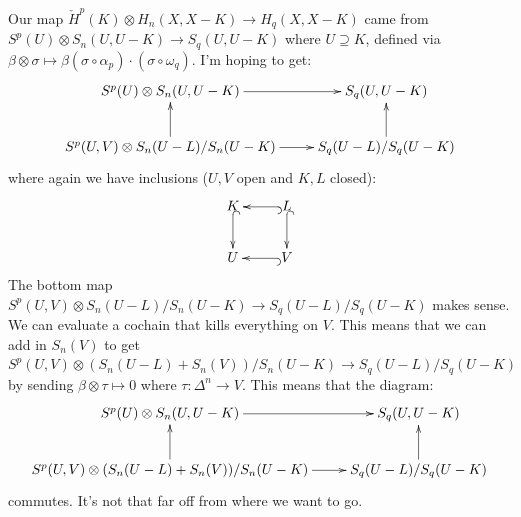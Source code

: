\documentclass{amsart}
\theoremstyle{theorem}
\theoremstyle{definition}
\newcommand\cHH{\check{H}}
\begin{document}
Our map $\cHH^p(K)\otimes H_n(X,X-K)\to H_q(X,X-K)$ came from $S^p(U)\otimes S_n(U,U-K)\to S_q(U,U-K)$ where $U\supseteq K$, defined via $\beta\otimes\sigma\mapsto\beta(\sigma\circ\alpha_p)\cdot(\sigma\circ\omega_q)$. I'm hoping to get:
\begin{equation*}
\xymatrix{
	S^p(U)\otimes S_n(U,U-K)\ar[r] & S_q(U,U-K)\\
	S^p(U,V)\otimes S_n(U-L)/S_n(U-K)\ar[r]\ar[u] & S_q(U-L)/S_q(U-K)\ar[u]
}
\end{equation*}
where again we have inclusions ($U,V$ open and $K,L$ closed):
\begin{equation*}
\xymatrix{K\ar@{^(->}[d] & L\ar@{^(->}[d]\ar@{^(->}[l] \\ U & V\ar@{^(->}[l]}
\end{equation*}
The bottom map $S^p(U,V)\otimes S_n(U-L)/S_n(U-K)\to S_q(U-L)/S_q(U-K)$ makes sense. We can evaluate a cochain that kills everything on $V$. This means that we can add in $S_n(V)$ to get $S^p(U,V)\otimes (S_n(U-L)+S_n(V))/S_n(U-K)\to S_q(U-L)/S_q(U-K)$ by sending $\beta\otimes\tau\mapsto 0$ where $\tau:\Delta^n\to V$. This means that the diagram:
\begin{equation*}
\xymatrix{
	S^p(U)\otimes S_n(U,U-K)\ar[r] & S_q(U,U-K)\\
	S^p(U,V)\otimes (S_n(U-L)+S_n(V))/S_n(U-K)\ar[r]\ar[u] & S_q(U-L)/S_q(U-K)\ar[u]
}
\end{equation*}
commutes. It's not that far off from where we want to go.
\end{document}
